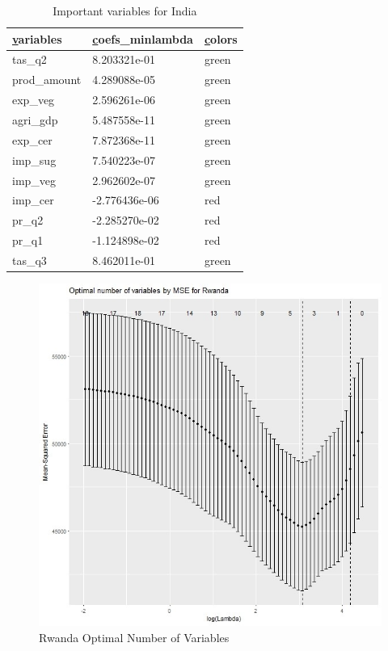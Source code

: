 \documentclass[11pt]{article}
\begin{document}
\FloatBarrier
\begin{table}[!htbp]
\begin{tabular}{lll}
\hline
{\ul variables}        & {\ul coefs\_minlambda} & {\ul colors} \\ \hline
tas\_q2                & 8.203321e-01           & green        \\
prod\_amount           & 4.289088e-05           & green        \\
exp\_veg               & 2.596261e-06           & green        \\
agri\_gdp              & 5.487558e-11           & green        \\
exp\_cer               & 7.872368e-11           & green        \\
imp\_sug               & 7.540223e-07           & green        \\
imp\_veg               & 2.962602e-07           & green        \\
imp\_cer               & -2.776436e-06          & red          \\
pr\_q2                 & -2.285270e-02          & red          \\
pr\_q1                 & -1.124898e-02          & red          \\
tas\_q3                & 8.462011e-01           & green       \\ \hline
\end{tabular}
\centering
\caption{Important variables for India}
\label{table19}
\end{table}
\FloatBarrier


\FloatBarrier
\begin{figure}[!htb]
\begin{center}
\includegraphics[scale=0.85]{L2.jpg}
\caption{Rwanda Optimal Number of Variables}
\label{figure10}
\end{center}
\end{figure}
\FloatBarrier
\end{document}
